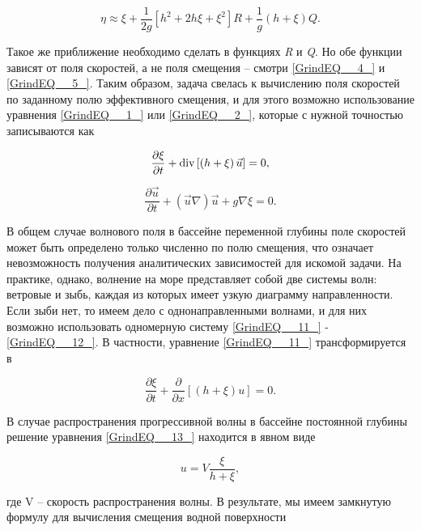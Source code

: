 \begin{equation} \label{GrindEQ__10_}
\eta \approx \xi +\frac{1}{2g} \left[h^{2} +2h\xi +\xi ^{2} \right]R+\frac{1}{g} (h+\xi )Q.
\end{equation}


Такое же приближение необходимо сделать в функциях \textit{R} и \textit{Q}. Но обе функции зависят от поля скоростей, а не поля смещения -- смотри \eqref{GrindEQ__4_} и \eqref{GrindEQ__5_}. Таким образом, задача свелась к вычислению поля скоростей по заданному полю эффективного смещения, и для этого возможно использование уравнения \eqref{GrindEQ__1_} или \eqref{GrindEQ__2_}, которые с нужной точностью записываются как

\begin{equation} \label{GrindEQ__11_}
\frac{\partial \xi }{\partial t} +{\rm div}\left[\left(h+\xi \right)\vec{u}\right]=0,
\end{equation}

\begin{equation} \label{GrindEQ__12_}
\frac{\partial \vec{u}}{\partial t} +(\vec{u}\nabla )\vec{u}+g\nabla \xi =0.
\end{equation}


В общем случае волнового поля в бассейне переменной глубины поле скоростей может быть определено только численно по полю смещения, что означает невозможность получения аналитических зависимостей для искомой задачи. На практике, однако, волнение на море представляет собой две системы волн: ветровые и зыбь, каждая из которых имеет узкую диаграмму направленности. Если зыби нет, то имеем дело с однонаправленными волнами, и для них возможно использовать одномерную систему \eqref{GrindEQ__11_} - \eqref{GrindEQ__12_}. В частности, уравнение \eqref{GrindEQ__11_} трансформируется в


\begin{equation} \label{GrindEQ__13_}
\frac{\partial \xi }{\partial t} +\frac{\partial }{\partial x} \left[\left(h+\xi \right)u\right]=0.
\end{equation}


В случае распространения прогрессивной волны в бассейне постоянной глубины решение уравнения \eqref{GrindEQ__13_} находится в явном виде

\begin{equation} \label{GrindEQ__14_}
u=V\frac{\xi }{h+\xi } ,
\end{equation}


где V -- скорость распространения волны. В результате, мы имеем замкнутую формулу для вычисления смещения водной поверхности

